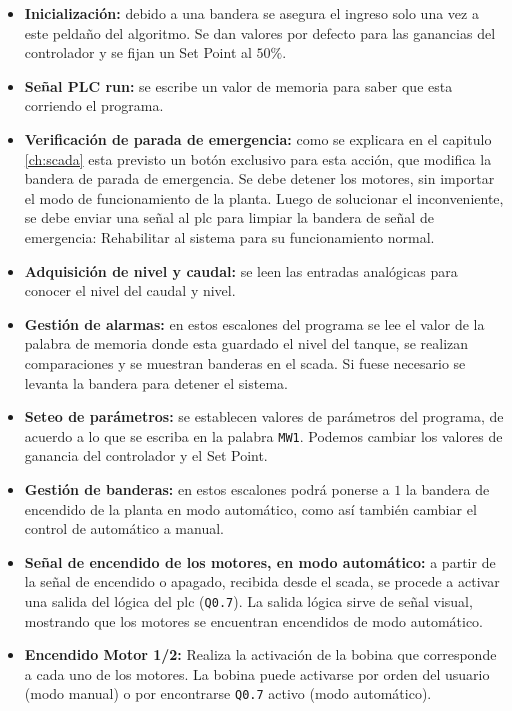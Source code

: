 \begin{itemize}
 \item \textbf{Inicialización:} debido a una bandera se asegura el ingreso solo
una vez a
 este peldaño del algoritmo. Se dan valores por defecto para las ganancias del 
 controlador y se fijan un Set Point al $50\%$.
 \item \textbf{Señal PLC run:} se escribe un valor de memoria para saber que
esta
 corriendo el programa.
 \item \textbf{Verificación de parada de emergencia:}
  como se explicara en el capitulo \ref{ch:scada} esta previsto un
 botón exclusivo para esta acción, que modifica la bandera de parada de
emergencia. Se debe detener
 los motores, sin importar el modo de funcionamiento de la planta.
 Luego de solucionar el inconveniente,
 se debe enviar una señal  al \gls{plc} para limpiar la bandera de señal de
emergencia: Rehabilitar al
sistema para su funcionamiento normal.

  \item \textbf{Adquisición de nivel y caudal:} se leen las entradas analógicas
para conocer
  el nivel del caudal y nivel.
  \item \textbf{Gestión de alarmas:} en estos escalones del programa se lee
  el valor de la palabra de memoria donde esta guardado el nivel del tanque,
  se realizan comparaciones y se muestran banderas en el \gls{scada}. Si
fuese necesario se levanta la bandera para detener el sistema.
  \item \textbf{Seteo de parámetros:}
  se establecen valores de parámetros del programa, de acuerdo
a lo que se escriba en la palabra \verb|MW1|.
Podemos cambiar los valores de ganancia del controlador y el Set Point.

  \item \textbf{Gestión de banderas:} en estos escalones podrá ponerse a $1$ la
bandera de encendido de la planta en modo automático, como así también cambiar
el control de automático a manual.

  \item \textbf{Señal de encendido de los motores, en modo automático:} a
partir de la señal de encendido o apagado, recibida desde el \gls{scada}, se
procede a activar una salida del lógica del  \gls{plc} (\verb|Q0.7|).
  La salida lógica sirve de señal visual, mostrando que los motores se
encuentran encendidos de modo automático.

  \item \textbf{Encendido Motor 1/2:}
  Realiza la activación de la bobina que corresponde a cada uno de los motores.
  La bobina puede activarse por orden del usuario (modo manual) o por
encontrarse \verb|Q0.7| activo (modo automático).


\end{itemize}
